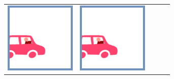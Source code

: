 \documentclass[12pt]{article}
\begin{document}
\begin{minipage}{\textwidth}
\begin{table}[H]
\begin{tabulary}{\linewidth}{|C|CCCC|}
				\vspace{0.01cm}\includegraphics[width=\linewidth]{option1} &
				\vspace{0.01cm}\includegraphics[width=\linewidth]{option1} &

\end{tabulary}
\end{table}
\end{minipage}
\end{document}

